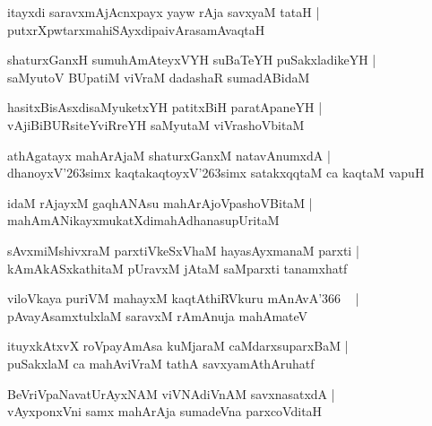 \documentclass[twoside,12pt,openright]{book}
\def\S{\char'263}
\newcounter{shloka}[chapter]
\begin{document}
\begin{shloka}%
itayxdi saravxmAjAcnxpayx  yayw rAja savxyaM tataH |\\
putxrXpwtarxmahiSAyxdipaivArasamAvaqtaH 
\end{shloka}

\begin{shloka}%
shaturxGanxH sumuhAmAteyxVYH suBaTeYH puSakxladikeYH |\\
saMyutoV BUpatiM viVraM dadashaR sumadABidaM 
\end{shloka}

\begin{shloka}%
hasitxBisAsxdisaMyuketxYH patitxBiH paratApaneYH |\\
vAjiBiBURsiteYviRreYH saMyutaM viVrashoVbitaM 
\end{shloka}

\begin{shloka}%
athAgatayx mahArAjaM shaturxGanxM natavAnumxdA |\\
dhanoyxV\S simx kaqtakaqtoyxV\S simx satakxqqtaM ca kaqtaM vapuH
\end{shloka}

\begin{shloka}%
idaM rAjayxM gaqhANAsu mahArAjoVpashoVBitaM |\\
mahAmANikayxmukatXdimahAdhanasupUritaM 
\end{shloka}

\begin{shloka}%
sAvxmiMshivxraM parxtiVkeSxVhaM hayasAyxmanaM parxti |\\
kAmAkASxkathitaM pUravxM jAtaM saMparxti tanamxhatf
\end{shloka}

\begin{shloka}%
viloVkaya puriVM mahayxM kaqtAthiRVkuru mAnAvA\char'366 ~ |\\
pAvayAsamxtulxlaM saravxM rAmAnuja mahAmateV 
\end{shloka}

\begin{shloka}%
ituyxkAtxvX roVpayAmAsa kuMjaraM caMdarxsuparxBaM |\\
puSakxlaM ca mahAviVraM tathA savxyamAthAruhatf 
\end{shloka}

\begin{shloka}%
BeVriVpaNavatUrAyxNAM viVNAdiVnAM savxnasatxdA |\\
vAyxponxVni samx mahArAja sumadeVna parxcoVditaH 
\end{shloka}
\end{document}
